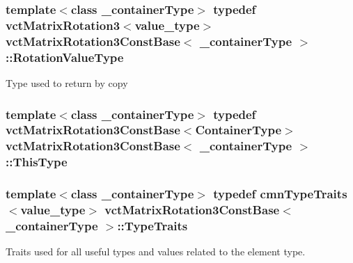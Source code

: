\subsubsection[{Rotation\+Value\+Type}]{\setlength{\rightskip}{0pt plus 5cm}template$<$class \+\_\+container\+Type$>$ typedef {\bf vct\+Matrix\+Rotation3}$<$value\+\_\+type$>$ {\bf vct\+Matrix\+Rotation3\+Const\+Base}$<$ \+\_\+container\+Type $>$\+::{\bf Rotation\+Value\+Type}}\label{classvct_matrix_rotation3_const_base_a913ecee79856db867ac6d45d27cfe362}
Type used to return by copy \hypertarget{classvct_matrix_rotation3_const_base_ad26bf016ce37ea0532e1ce0aa7bba8a0}{}
\subsubsection[{This\+Type}]{\setlength{\rightskip}{0pt plus 5cm}template$<$class \+\_\+container\+Type$>$ typedef {\bf vct\+Matrix\+Rotation3\+Const\+Base}$<${\bf Container\+Type}$>$ {\bf vct\+Matrix\+Rotation3\+Const\+Base}$<$ \+\_\+container\+Type $>$\+::{\bf This\+Type}}\label{classvct_matrix_rotation3_const_base_ad26bf016ce37ea0532e1ce0aa7bba8a0}
\hypertarget{classvct_matrix_rotation3_const_base_af73335dedec5af83c5715335bbc8fce1}{}
\subsubsection[{Type\+Traits}]{\setlength{\rightskip}{0pt plus 5cm}template$<$class \+\_\+container\+Type$>$ typedef {\bf cmn\+Type\+Traits}$<$value\+\_\+type$>$ {\bf vct\+Matrix\+Rotation3\+Const\+Base}$<$ \+\_\+container\+Type $>$\+::{\bf Type\+Traits}}\label{classvct_matrix_rotation3_const_base_af73335dedec5af83c5715335bbc8fce1}
Traits used for all useful types and values related to the element type. 

